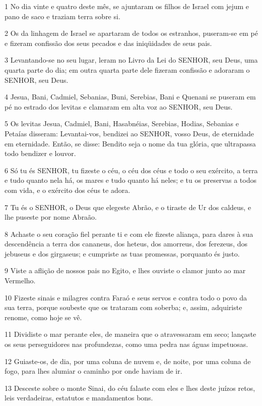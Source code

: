 \par 1 No dia vinte e quatro deste mês, se ajuntaram os filhos de Israel com jejum e pano de saco e traziam terra sobre si.
\par 2 Os da linhagem de Israel se apartaram de todos os estranhos, puseram-se em pé e fizeram confissão dos seus pecados e das iniqüidades de seus pais.
\par 3 Levantando-se no seu lugar, leram no Livro da Lei do SENHOR, seu Deus, uma quarta parte do dia; em outra quarta parte dele fizeram confissão e adoraram o SENHOR, seu Deus.
\par 4 Jesua, Bani, Cadmiel, Sebanias, Buni, Serebias, Bani e Quenani se puseram em pé no estrado dos levitas e clamaram em alta voz ao SENHOR, seu Deus.
\par 5 Os levitas Jesua, Cadmiel, Bani, Hasabnéias, Serebias, Hodias, Sebanias e Petaías disseram: Levantai-vos, bendizei ao SENHOR, vosso Deus, de eternidade em eternidade. Então, se disse: Bendito seja o nome da tua glória, que ultrapassa todo bendizer e louvor.
\par 6 Só tu és SENHOR, tu fizeste o céu, o céu dos céus e todo o seu exército, a terra e tudo quanto nela há, os mares e tudo quanto há neles; e tu os preservas a todos com vida, e o exército dos céus te adora.
\par 7 Tu és o SENHOR, o Deus que elegeste Abrão, e o tiraste de Ur dos caldeus, e lhe puseste por nome Abraão.
\par 8 Achaste o seu coração fiel perante ti e com ele fizeste aliança, para dares à sua descendência a terra dos cananeus, dos heteus, dos amorreus, dos ferezeus, dos jebuseus e dos girgaseus; e cumpriste as tuas promessas, porquanto és justo.
\par 9 Viste a aflição de nossos pais no Egito, e lhes ouviste o clamor junto ao mar Vermelho.
\par 10 Fizeste sinais e milagres contra Faraó e seus servos e contra todo o povo da sua terra, porque soubeste que os trataram com soberba; e, assim, adquiriste renome, como hoje se vê.
\par 11 Dividiste o mar perante eles, de maneira que o atravessaram em seco; lançaste os seus perseguidores nas profundezas, como uma pedra nas águas impetuosas.
\par 12 Guiaste-os, de dia, por uma coluna de nuvem e, de noite, por uma coluna de fogo, para lhes alumiar o caminho por onde haviam de ir.
\par 13 Desceste sobre o monte Sinai, do céu falaste com eles e lhes deste juízos retos, leis verdadeiras, estatutos e mandamentos bons.
